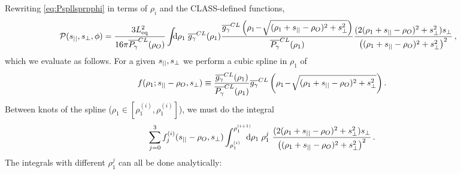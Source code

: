 \documentclass[fleqn,usenatbib]{mnras}
\begin{document}
    Rewriting \autoref{eq:Pspllsprpphi} in terms of $\rho_i$ and the
    CLASS-defined functions,
    \begin{align} \label{eq:Pspllsprpphi_app}
        \mcal{P}(\spll,\sprp,\phi)
            &= \frac{3\Leq^2}{16\pi\PgamBarCL(\rho_O)}
                \int\!\!\! \dif{\rho_1} \; \GgamBarCL(\rho_1) \frac
                {\GgamBarCL\left(\rho_1\! - \! \sqrt{(\rho_1+\spll-\rho_O)^2+ \sprp^2}\right)}{\PgamBarCL(\rho_1)}
                \frac{(2(\rho_1+\spll-\rho_O)^2 + \sprp^2)\sprp}{\left((\rho_1+\spll-\rho_O)^2+\sprp^2\right)^2} \,,
    \end{align}
    which we evaluate as follows.  For a given $s_{||}, s_{\perp}$ we perform a cubic
    spline in $\rho_1$ of
    \begin{equation}\label{eq:spline_gPg}
        f(\rho_1;s_{||}-\rho_O,s_{\perp}) \equiv
        \frac{\overline{g_\gamma}^{CL}(\rho_1)} {\overline{P_{\gamma}}^{CL}(\rho_1)}
                {\overline{g_\gamma}^{CL}\left(\rho_1\! - \! \sqrt{(\rho_1+s_{||}-\rho_O)^2+ s_{\perp}^2}\right)} \,.
    \end{equation}
    Between knots of the spline ($\rho_1\in[\rho_1^{(i)},\rho_1^{(i)}]$), we
    must do the integral
    \begin{equation}\label{eq:spline_integral_P}
        \sum_{j=0}^3 f_j^{(i)}(\spll-\rho_O,\sprp)
         \int_{\rho_1^{(i)}}^{\rho_1^{(i+1)}}\!\!\!\!\! \dif{\rho_1} \;
         \rho_1^j~
         \frac{(2(\rho_1+\spll-\rho_O)^2 +
                \sprp^2)\sprp}{\left(( \rho_1+\spll-\rho_O)^2+\sprp^2\right)^2} \,.
    \end{equation}
    The integrals with different $\rho_1^j$ can all be done analytically:
\end{document}

